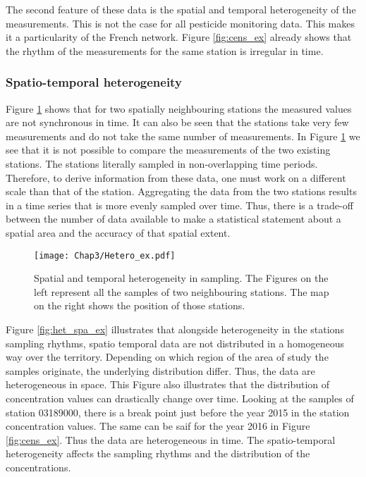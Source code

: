 The second feature of these data is the spatial and temporal heterogeneity of the measurements. This is not the case for all pesticide monitoring data. This makes it a particularity of the French network. Figure \ref{fig:cens_ex} already shows that the rhythm of the measurements for the same station is irregular in time. 

\subsubsection{Spatio-temporal heterogeneity}

Figure \ref{fig:het_samp_ex} shows that for two spatially neighbouring stations the measured values are not synchronous in time. It can also be seen that the stations take very few measurements and do not take the same number of measurements. In Figure \ref{fig:het_samp_ex} we see that it is not possible to compare the measurements of the two existing stations. The stations literally sampled in non-overlapping time periods. Therefore, to derive information from these data, one must work on a different scale than that of the station. Aggregating the data from the two stations results in a time series that is more evenly sampled over time. Thus, there is a trade-off between the number of data available to make a statistical statement about a spatial area and the accuracy of that spatial extent. 

\begin{figure}[ht]
    \centering
    \texttt{[image: Chap3/Hetero\_ex.pdf]}
    \caption{Spatial and temporal heterogeneity in sampling. The Figures on the left represent all the samples of two neighbouring stations. The map on the right shows the position of those stations.}
    \label{fig:het_samp_ex}
\end{figure}

Figure \ref{fig:het_spa_ex} illustrates that alongside heterogeneity in the stations sampling rhythms, spatio temporal data are not distributed in a homogeneous way over the territory. Depending on which region of the area of study the samples originate, the underlying distribution differ. Thus, the data are heterogeneous in space. This Figure also illustrates that the distribution of concentration values can drastically change over time. Looking at the samples of station 03189000, there is a break point just before the year 2015 in the station concentration values. The same can be saif for the year 2016 in Figure \ref{fig:cens_ex}. Thus the data are heterogeneous in time. The spatio-temporal heterogeneity affects the sampling rhythms and the distribution of the concentrations. 

